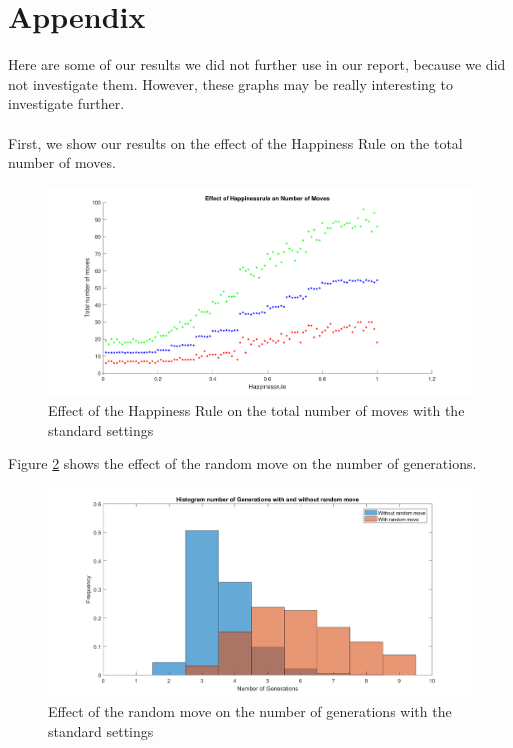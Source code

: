 \section*{Appendix} 

Here are some of our results we did not further use in our report, because we did not investigate them.
However, these graphs may be really interesting to investigate further.\\
\\
First, we show our results on the effect of the Happiness Rule on the total number of moves.

\begin{figure}[H]
	\centering
    \includegraphics[width=\textwidth]{happinessregel-aantmov.pdf}
    \caption{Effect of the Happiness Rule on the total number of moves with the standard settings}
    \label{fig:happinessrule-moves}
\end{figure}

Figure \ref{fig:randmove-generations} shows the effect of the random move on the number of generations.

\begin{figure}[H]
	\centering
    \includegraphics[width=\textwidth]{histaantgenrandverp.pdf}
    \caption{Effect of the random move on the number of generations with the standard settings}
    \label{fig:randmove-generations}
\end{figure}

